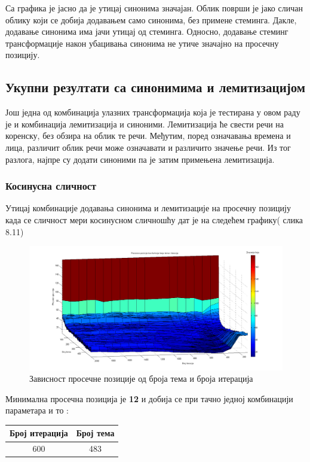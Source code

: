 Са графика је јасно да је утицај синонима значајан. Облик површи је јако сличан облику који се добија додавањем само синонима, без примене стеминга. Дакле, додавање синонима има јачи утицај од стеминга. Односно, додавање стеминг трансформације након убацивања синонима не утиче значајно на просечну позицију. 

\subsection{Укупни резултати са синонимима и лемитизацијом}

Још једна од комбинација улазних трансформација која је тестирана у овом раду је и комбинација лемитизација и синоними. Лемитизација ће свести речи на коренску, без обзира на облик те речи. Међутим, поред означавања времена и лица, различит облик речи може означавати и различито значење речи. Из тог разлога, најпре су додати синоними па је затим примењена лемитизација.

\subsubsection{Косинусна сличност}



Утицај  комбинације додавања синонима и лемитизације на просечну позицију  када се сличност мери косинусном сличношћу дат је на следећем графику( слика 8.11)


		\begin{figure}[H]
    \centering
   \includegraphics[scale=0.3]{./Slike/LemmSyn.png} 
	\caption{Зависност просечне позиције од броја тема и броја итерација}
	\label{fig:slika1}
\end{figure}

Минимална просечна позиција је \textbf{12} и добија се при тачно једној комбинацији параметара и то :

\begin{center}
\begin{tabular}{|c|c|}
\hline
Број итерација & Број тема \\
\hline\hline
600 & 483 \\

\hline
\end{tabular}
\end{center}

